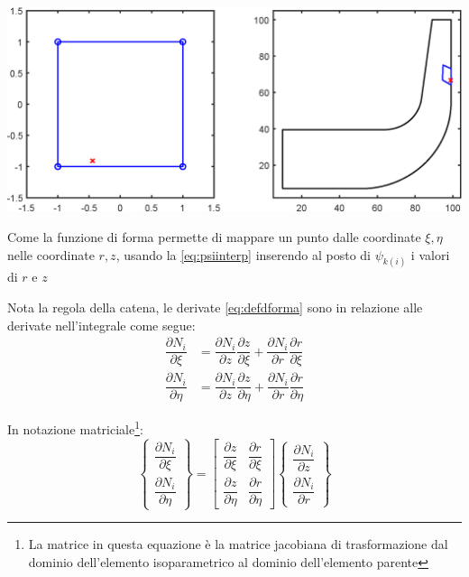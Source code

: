 \documentclass{tufte-handout}
\newcommand{\de}[2]{\dfrac{\partial #1}{\partial #2}}
\begin{document}
\begin{marginfigure}%
  \includegraphics[width=\linewidth]{fem/mappatura.eps}
  \caption{Come la funzione di forma permette di mappare un punto dalle coordinate $\xi,\eta$ nelle coordinate $r,z$, usando la \ref{eq:psiinterp} inserendo al posto di $\psi_{k(i)}$ i valori di $r$ e $z$}
  \label{fig:mappatura}
\end{marginfigure}

Nota la regola della catena, le derivate \ref{eq:defdforma} sono in relazione alle derivate nell'integrale come segue:
\begin{align*}
    \de{N_i}{\xi} &= \de{N_i}{z}\de{z}{\xi}+\de{N_i}{r}\de{r}{\xi} \\
    \de{N_i}{\eta} &= \de{N_i}{z}\de{z}{\eta}+\de{N_i}{r}\de{r}{\eta}
\end{align*}

\begin{fullwidth}
In notazione matriciale\footnote{La matrice in questa equazione è la matrice jacobiana di trasformazione dal dominio dell'elemento isoparametrico al dominio dell'elemento parente}:
\[
\begin{Bmatrix}
    \de{N_i}{\xi} \\ \de{N_i}{\eta}
\end{Bmatrix}
=
\begin{bmatrix}
    \de{z}{\xi} & \de{r}{\xi}\\ \de{z}{\eta} & \de{r}{\eta}
\end{bmatrix}
\begin{Bmatrix}
    \de{N_i}{z} \\ \de{N_i}{r}
\end{Bmatrix}
\]
\end{fullwidth}
\end{document}
